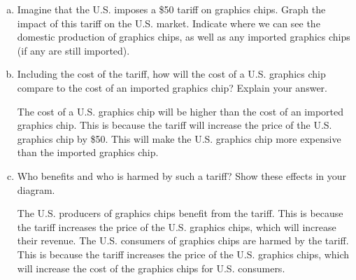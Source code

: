 \documentclass{article}
\begin{document}
\begin{enumerate}[(a)]
    \item Imagine that the U.S. imposes a \$50 tariff on graphics chips. Graph the impact of this tariff on the U.S. market. Indicate where we can see the domestic production of graphics chips, as well as any imported graphics chips (if any are still imported).
    

    \item Including the cost of the tariff, how will the cost of a U.S. graphics chip compare to the cost of an imported graphics chip? Explain your answer.
    
    The cost of a U.S. graphics chip will be higher than the cost of an imported graphics chip. This is because the tariff will increase the price of the U.S. graphics chip by \$50. This will make the U.S. graphics chip more expensive than the imported graphics chip.

    \item Who benefits and who is harmed by such a tariff? Show these effects in your diagram.
    
    The U.S. producers of graphics chips benefit from the tariff. This is because the tariff increases the price of the U.S. graphics chips, which will increase their revenue. The U.S. consumers of graphics chips are harmed by the tariff. This is because the tariff increases the price of the U.S. graphics chips, which will increase the cost of the graphics chips for U.S. consumers.
\end{enumerate}
\end{document}
